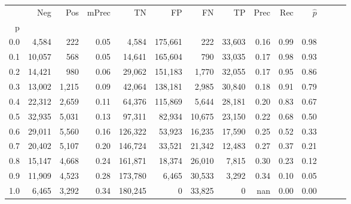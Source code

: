 \begin{tabular}{rrrrrrrrrrrrrr}
\toprule
{} &     Neg &    Pos & mPrec &       TN &       FP &      FN &      TP &  Prec &   Rec & $\hat{p}$ \\
p   &         &        &       &          &          &         &         &       &       &           \\
\midrule
0.0 &   4,584 &    222 &  0.05 &    4,584 &  175,661 &     222 &  33,603 &  0.16 &  0.99 &      0.98 \\
0.1 &  10,057 &    568 &  0.05 &   14,641 &  165,604 &     790 &  33,035 &  0.17 &  0.98 &      0.93 \\
0.2 &  14,421 &    980 &  0.06 &   29,062 &  151,183 &   1,770 &  32,055 &  0.17 &  0.95 &      0.86 \\
0.3 &  13,002 &  1,215 &  0.09 &   42,064 &  138,181 &   2,985 &  30,840 &  0.18 &  0.91 &      0.79 \\
0.4 &  22,312 &  2,659 &  0.11 &   64,376 &  115,869 &   5,644 &  28,181 &  0.20 &  0.83 &      0.67 \\
0.5 &  32,935 &  5,031 &  0.13 &   97,311 &   82,934 &  10,675 &  23,150 &  0.22 &  0.68 &      0.50 \\
0.6 &  29,011 &  5,560 &  0.16 &  126,322 &   53,923 &  16,235 &  17,590 &  0.25 &  0.52 &      0.33 \\
0.7 &  20,402 &  5,107 &  0.20 &  146,724 &   33,521 &  21,342 &  12,483 &  0.27 &  0.37 &      0.21 \\
0.8 &  15,147 &  4,668 &  0.24 &  161,871 &   18,374 &  26,010 &   7,815 &  0.30 &  0.23 &      0.12 \\
0.9 &  11,909 &  4,523 &  0.28 &  173,780 &    6,465 &  30,533 &   3,292 &  0.34 &  0.10 &      0.05 \\
1.0 &   6,465 &  3,292 &  0.34 &  180,245 &        0 &  33,825 &       0 &   nan &  0.00 &      0.00 \\
\bottomrule
\end{tabular}
